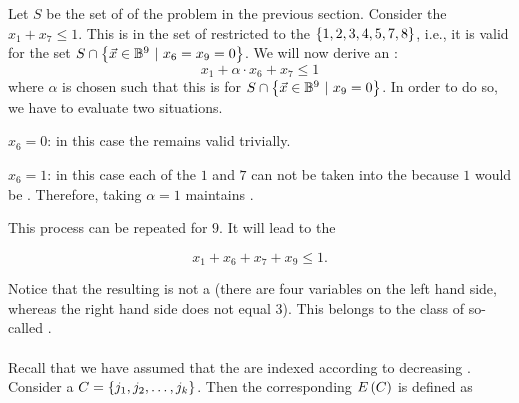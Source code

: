 \begin{example}Let $S$ be the set of  of the problem in the previous section. Consider the  $x_1+x_7\leq1$. This  is  in the set of  restricted to the  $\left\{ 1,2,3,4,5,7,8 \right\}$, i.e., it is valid for the set $S\cap\left\{ \vec{x}\in\mathbb{B}^9\ |\ x_6=x_9=0 \right\}$. We will now derive an :
\begin{equation}
x_1+\alpha\cdot x_6+x_7\leq1
\end{equation}
where $\alpha$ is chosen such that this  is  for $S\cap\left\{ \vec{x}\in\mathbb{B}^9\ |\ x_9=0 \right\}$. In order to do so, we have to evaluate two situations.

\begin{sitenum}
 \item $x_6=0$: in this case the  remains valid trivially.
 \item $x_6=1$: in this case each of the  $1$ and $7$ can not be taken into the  because  $1$ would be . Therefore, taking $\alpha=1$ maintains .
\end{sitenum}

This process can be repeated for  $9$. It will lead to the 

\begin{equation}
x_1+x_6+x_7+x_9\leq1.
\end{equation}

Notice that the resulting  is not a  (there are four variables on the left hand side, whereas the right hand side does not equal $3$). This  belongs to the class of so-called .
\end{example}

\paragraph{}
Recall that we have assumed that the  are indexed according to decreasing . Consider a  $C=\left\{ j_1,j_2,\ldots,j_k \right\}$. Then the corresponding  $E\left( C \right)$ is defined as

